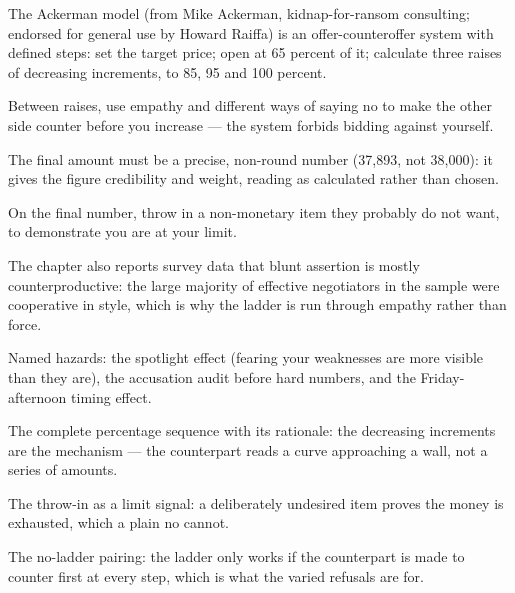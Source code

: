 

\begin{distilled}
  \item The Ackerman model (from Mike Ackerman, kidnap-for-ransom consulting; endorsed for general use by Howard Raiffa) is an offer-counteroffer system with defined steps: set the target price; open at 65 percent of it; calculate three raises of decreasing increments, to 85, 95 and 100 percent.
  \item Between raises, use empathy and different ways of saying no to make the other side counter before you increase --- the system forbids bidding against yourself.
  \item The final amount must be a precise, non-round number (37,893, not 38,000): it gives the figure credibility and weight, reading as calculated rather than chosen.
  \item On the final number, throw in a non-monetary item they probably do not want, to demonstrate you are at your limit.
  \item The chapter also reports survey data that blunt assertion is mostly counterproductive: the large majority of effective negotiators in the sample were cooperative in style, which is why the ladder is run through empathy rather than force.
  \item Named hazards: the spotlight effect (fearing your weaknesses are more visible than they are), the accusation audit before hard numbers, and the Friday-afternoon timing effect.
\end{distilled}

\begin{unique}
  \item The complete percentage sequence with its rationale: the decreasing increments are the mechanism --- the counterpart reads a curve approaching a wall, not a series of amounts.
  \item The throw-in as a limit signal: a deliberately undesired item proves the money is exhausted, which a plain no cannot.
  \item The no-ladder pairing: the ladder only works if the counterpart is made to counter first at every step, which is what the varied refusals are for.
\end{unique}
